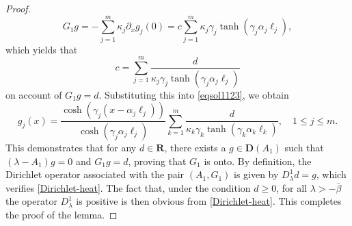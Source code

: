 \documentclass[10pt,a4paper]{amsart}
\def\R{\mathbf{R}}
\def\la{\lambda}
\begin{document}
\begin{proof}
\begin{equation*}
G_1 g = -\sum_{j=1}^m \kappa_j \partial_x g_j(0) = c \sum_{j=1}^m \kappa_j \gamma_j \tanh(\gamma_j \alpha_j \ell_j),
\end{equation*}
which yields that
\begin{equation*}
c=\sum_{j=1}^m\frac{d}{ \kappa_j \gamma_j \tanh(\gamma_j \alpha_j \ell_j)}
\end{equation*}
on account of $G_1g=d$. Substituting this into \eqref{eqsol1123}, we obtain
\begin{equation*}
g_j(x) = \frac{\cosh(\gamma_j (x-\alpha_j \ell_j))}{\cosh(\gamma_j \alpha_j \ell_j)}\sum_{k=1}^m\frac{d}{ \kappa_k \gamma_k \tanh(\gamma_k \alpha_k \ell_k)},\quad 1 \le j\le m.
\end{equation*}
This demonstrates that for any $d \in \R$, there exists a $g \in \bm{D}(A_1)$ such that $(\lambda - A_1)g = 0$ and $G_1 g = d$, proving that $G_1$ is onto. By definition, the Dirichlet operator associated with the pair $(A_1,G_1)$ is given by $D_\lambda^1 d = g$, which verifies \eqref{Dirichlet-heat}. The fact that, under the condition $d\ge 0$, for all $\lambda>-\bar{\beta}$ the operator $D_\la^1$ is positive is then obvious from \eqref{Dirichlet-heat}. This completes the proof of the lemma.
\end{proof}
\end{document}
